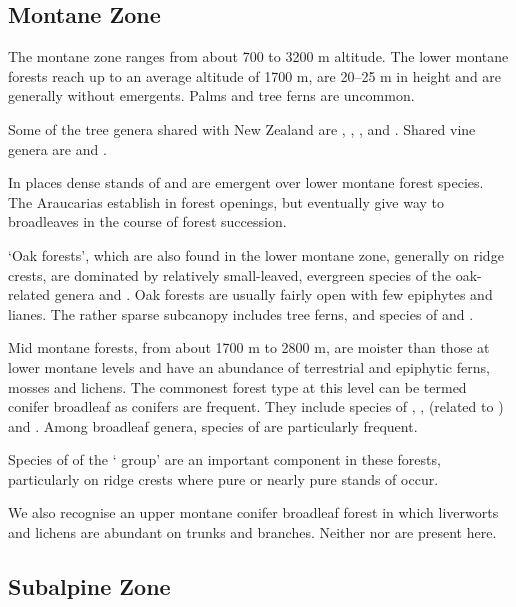 \subsection{Montane Zone}

The montane zone ranges from about 700 to 3200 m altitude.
The lower montane forests reach up to an average altitude of 1700 m, are 20–25 m in height and are generally without emergents.
Palms and tree ferns are uncommon.

Some of the tree genera shared with New Zealand are , , ,  and .
Shared vine genera are  and .

In places dense stands of  and  are emergent over lower montane forest species.
The Araucarias establish in forest openings, but eventually give way to broadleaves in the course of forest succession.

`Oak forests', which are also found in the lower montane zone, generally on ridge crests, are dominated by relatively small-leaved, evergreen species of the oak-related genera  and .
Oak forests are usually fairly open with few epiphytes and lianes.
The rather sparse subcanopy includes tree ferns,  and species of  and .

Mid montane forests, from about 1700 m to 2800 m, are moister than those at lower montane levels and have an abundance of terrestrial and epiphytic ferns, mosses and lichens.
The commonest forest type at this level can be termed conifer broadleaf as conifers are frequent.
They include species of , ,  (related to ) and .
Among broadleaf genera, species of  are particularly frequent.

Species of  of the ` group' are an important component in these forests, particularly on ridge crests where pure or nearly pure stands of  occur.

We also recognise an upper montane conifer broadleaf forest in which liverworts and lichens are abundant on trunks and branches.
Neither  nor  are present here.

\subsection{Subalpine Zone}

